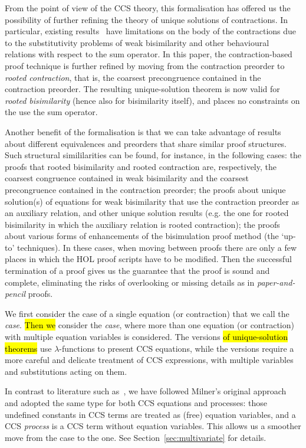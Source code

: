 From the point of view of the CCS theory, this formalisation has offered us the possibility of
further refining the theory of unique solutions of contractions.
In particular,  existing results~\cite{sangiorgi2017equations} have limitations on the body of the contractions due to the
substitutivity problems of weak bisimilarity and other behavioural relations with respect
to the sum operator.
In this paper, the contraction-based proof technique is further
refined by moving from the contraction preorder to
\emph{rooted contraction}, that is, the coarsest precongruence contained in the contraction
preorder. The resulting unique-solution theorem is now valid for
\emph{rooted bisimilarity} (hence also for bisimilarity itself), and places no 
constraints on the use the sum operator.

Another benefit of the formalisation is 
that we can take advantage of results about different 
equivalences and preorders that share similar proof structures.
Such structural simililarities can be found, for instance, in the
following cases: the proofs that rooted bisimilarity and rooted
contraction are, respectively, the coarsest congruence contained in
weak bisimilarity and the coarsest precongruence contained in the
contraction preorder; the proofs about unique solution(s) of equations
for weak bisimilarity that use the contraction preorder as an
auxiliary relation, and other unique solution results (e.g. the one
for rooted bisimilarity 
 in which the auxiliary relation is rooted contraction); the
proofs about various forms of enhancements of the bisimulation proof
method (the `up-to' techniques).
%
In these cases, when moving between proofs there are only a few places in
which the HOL proof scripts have to be modified.
Then the successful termination of a proof gives us the
 guarantee that the proof is
sound and complete, eliminating the risks 
of overlooking or missing details as in \emph{paper-and-pencil} proofs.

We first consider the case of a single equation (or contraction)
that we call the \emph{\univariate case}. \hl{Then we} consider
the \emph{\multivariate case}, where more than one equation
  (or contraction) with multiple equation variables is considered.
The \univariate versions \hl{of unique-solution theorems} use
$\lambda$-functions to present CCS equations,
while the \multivariate versions require a
more careful and delicate treatment of CCS
expressions, with multiple variables and substitutions acting on them.

In contrast to literature  such as~\cite{Gorrieri:2015jt},
we have followed Milner's original approach~\cite{milner1990operational} and adopted the same
type for both CCS equations and processes: those undefined constants
in CCS terms are treated as  (free) equation variables, and a CCS
\emph{process} is a CCS term without equation variables. 
This allows us a smoother move from the \univariate case to the \multivariate
one. See Section~\ref{sec:multivariate} for  details.

